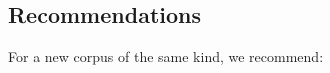 \documentclass[referee,lineno,pdflatex,sn-vancouver-num]{sn-jnl}
\theoremstyle{thmstyleone}%
\theoremstyle{thmstyletwo}%
\theoremstyle{thmstylethree}%
\begin{document}
\subsection{Recommendations}\label{sec:recommendations}
For a new corpus of the same kind, we recommend:
\end{document}
